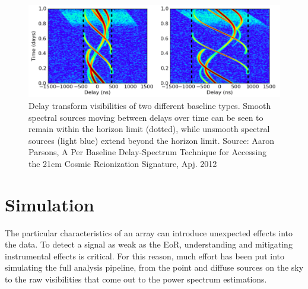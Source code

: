 \documentclass[a0,landscape]{a0poster}
\begin{document}
\begin{multicols}{4}
\begin{figure}[H]
\centering
\label{foregroundsrcs}
\includegraphics[width=0.8\linewidth]{figures/delaytransform.png}
\caption{Delay transform visibilities of two different baseline types. Smooth spectral sources moving between delays over time can be seen to remain within the horizon limit (dotted), while unsmooth spectral sources (light blue) extend beyond the horizon limit.  Source: Aaron Parsons, A Per Baseline Delay-Spectrum Technique for Accessing the 21cm Cosmic Reionization Signature, Apj. 2012}
\end{figure}


\section*{Simulation}

The particular characteristics of an array can introduce unexpected effects into the data. To detect a signal as weak as the EoR, understanding and mitigating instrumental effects is critical. For this reason, much effort has been put into simulating the full analysis pipeline, from the point and diffuse sources on the sky to the raw visibilities that come out to the power spectrum estimations.


\end{multicols}
\end{document}
